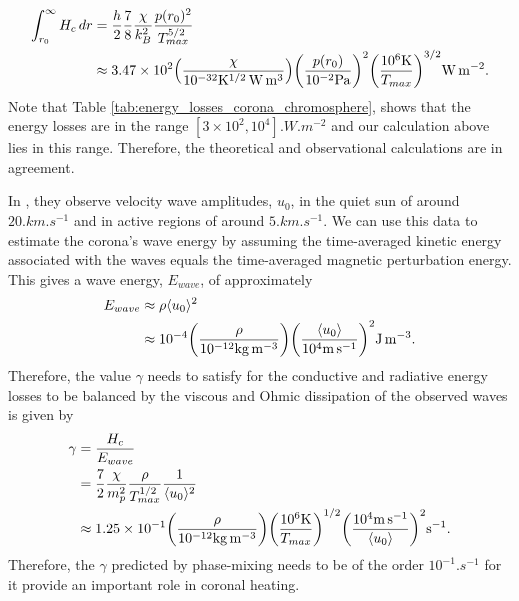\begin{equation}
    \begin{aligned}
    \int_{r_0}^\infty H_c \, dr &= \frac{h}{2}\frac{7}{8}\frac{\chi}{k_B^2}\frac{p(r_0)^2}{T_{max}^{5/2}} \\
    &\approx 3.47\times10^{2}\qty(\frac{\chi}{10^{-32}\si{.K^{1/2}.W.m^3}})\qty(\frac{p(r_0)}{10^{-2}\si{.Pa}})^2\qty(\frac{10^6\si{.K}}{T_{max}})^{3/2}\si{.W.m^{-2}}.
    \end{aligned}
\end{equation}
Note that Table \ref{tab:energy_losses_corona_chromosphere}, shows that the energy losses are in the range $[3\times10^2,10^4]\si{.W.m^{-2}}$ and our calculation above lies in this range. Therefore, the theoretical and observational calculations are in agreement. 

In \citet{McIntosh2011,McIntosh2012}, they observe velocity wave amplitudes, $u_0$, in the quiet sun of around $20\si{.km.s^{-1}}$ and in active regions of around $5\si{.km.s^{-1}}$. We can use this data to estimate the corona's wave energy by assuming the time-averaged kinetic energy associated with the waves equals the time-averaged magnetic perturbation energy. This gives a wave energy, $E_{wave}$, of approximately
\begin{equation}
    \label{eq:chap_3_observed_wave_energy}
    \begin{aligned}
    E_{wave} &\approx \rho \langle u_0 \rangle^2 \\
    &\approx10^{-4}\qty(\frac{\rho}{10^{-12}\si{.kg.m^{-3}}}) \qty(\frac{\langle u_0 \rangle}{10^4 \si{.m.s^{-1}}})^2\si{.J.m^{-3}}.
    \end{aligned}
\end{equation}
Therefore, the value $\gamma$ needs to satisfy for the conductive and radiative energy losses to be balanced by the viscous and Ohmic dissipation of the observed waves is given by
\begin{equation}
\label{eq:required_gamma}
\begin{aligned}
    \gamma &= \frac{H_c}{E_{wave}} \\
    &= \frac{7}{2}\frac{\chi}{m_p^2}\frac{\rho}{T_{max}^{1/2}}\frac{1}{\langle u_0\rangle^2} \\
    &\approx1.25\times10^{-1}\qty(\frac{\rho}{10^{-12}\si{.kg.m^{-3}}})\qty(\frac{10^6\si{.K}}{T_{max}})^{1/2}\qty(\frac{10^{4}\si{.m.s^{-1}}}{\langle u_0 \rangle})^2\si{.s^{-1}}.
\end{aligned}
\end{equation}
Therefore, the $\gamma$ predicted by phase-mixing needs to be of the order $10^{-1}\si{.s^{-1}}$ for it provide an important role in coronal heating.

